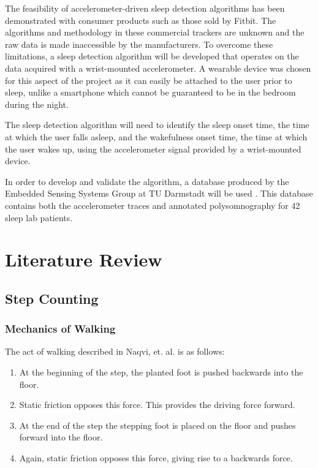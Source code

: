             The feasibility of accelerometer-driven sleep detection algorithms has been demonstrated with consumer products such as those sold by Fitbit. The algorithms and methodology in these commercial trackers are unknown and the raw data is made inaccessible by the manufacturers. To overcome these limitations, a sleep detection algorithm will be developed that operates on the data acquired with a wrist-mounted accelerometer. A wearable device was chosen for this aspect of the project as it can easily be attached to the user prior to sleep, unlike a smartphone which cannot be guaranteed to be in the bedroom during the night.

            The sleep detection algorithm will need to identify the sleep onset time, the time at which the user falls asleep, and the wakefulness onset time, the time at which the user wakes up, using the accelerometer signal provided by a wrist-mounted device.

            In order to develop and validate the algorithm, a database produced by the Embedded Sensing Systems Group at TU Darmstadt will be used \cite{database}. This database contains both the accelerometer traces and annotated polysomnography for 42 sleep lab patients.


    \chapter{Literature Review}


        \section{Step Counting}
        \label{sc_lit}

            \subsection{Mechanics of Walking}

                The act of walking described in Naqvi, et. al. \cite{navqi} is as follows:

                \begin{enumerate}
                    \item At the beginning of the step, the planted foot is pushed backwards into the floor.
                    \item Static friction opposes this force. This provides the driving force forward.
                    \item At the end of the step the stepping foot is placed on the floor and pushes forward into the floor.
                    \item Again, static friction opposes this force, giving rise to a backwards force.
                \end{enumerate}

